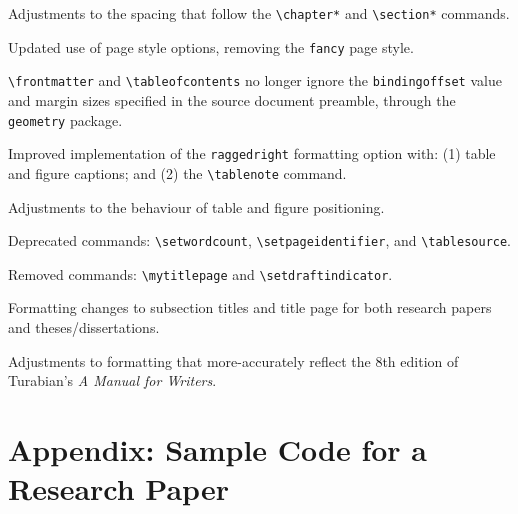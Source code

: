 \documentclass{article}
\newcommand{\textcmd}[1]{\texttt{\textbackslash #1}}
\begin{document}
Adjustments to the spacing that follow the \textcmd{chapter*} and \textcmd{section*} commands.

Updated use of page style options, removing the \texttt{fancy} page style.

\textcmd{frontmatter} and \textcmd{tableofcontents} no longer ignore the \texttt{bindingoffset} value and margin sizes specified in the source document preamble, through the \texttt{geometry} package.

Improved implementation of the \texttt{raggedright} formatting option with: (1) table and figure captions; and (2) the \textcmd{tablenote} command.

Adjustments to the behaviour of table and figure positioning.

Deprecated commands: \textcmd{setwordcount}, \textcmd{setpageidentifier}, and \textcmd{tablesource}.

Removed commands: \textcmd{mytitlepage} and \textcmd{setdraftindicator}.

%
Formatting changes to subsection titles and title page for both research papers and theses/dissertations.

%
Adjustments to formatting that more-accurately reflect the 8th edition of Turabian's \emph{A Manual for Writers}.


\clearpage
\printbibliography



\clearpage

\section*{Appendix: Sample Code for a Research Paper}
\label{sec:sample_code}

\vspace{1.3\baselineskip}
\end{document}
